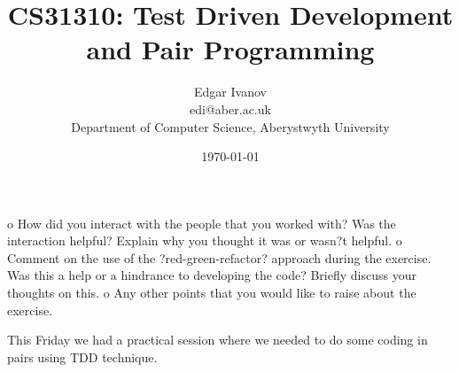 \documentclass[]{report}
\begin{document}
\title{CS31310: Test Driven Development and Pair Programming}
\author{Edgar Ivanov\\ edi@aber.ac.uk \\ Department of Computer Science, Aberystwyth University}
\date{\today}
\maketitle
o  How	did	you	interact	with	the	people	that	you	worked	with?	Was	the	
interaction	helpful?	Explain	why	you	thought	it	was	or	wasn?t	helpful.	
o  Comment	on	the	use	of	the	?red-green-refactor?	approach	during	the	exercise.	
Was	this	a	help	or	a	hindrance	to	developing	the	code?	Briefly	discuss	your	
thoughts	on	this.	
o  Any	other	points	that	you	would	like	to	raise	about	the	exercise.		

This Friday we had a practical session where we needed to do some coding in pairs using TDD technique.  



\end{document}
